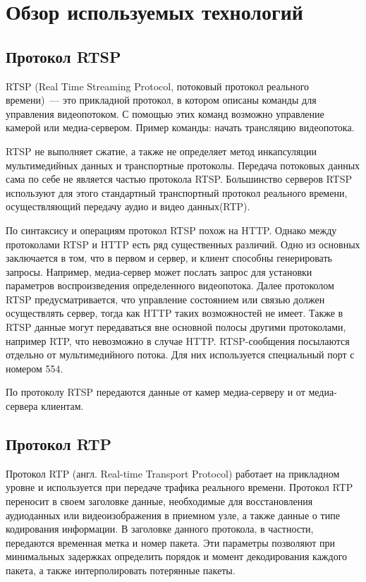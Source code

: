 \section{Обзор используемых технологий}

\subsection{Протокол RTSP}
RTSP (Real Time Streaming Protocol, потоковый протокол реального времени)~--- это прикладной протокол,
в котором описаны команды для управления видеопотоком.
С помощью этих команд возможно управление камерой или медиа-сервером.
Пример команды: начать трансляцию видеопотока.

RTSP не выполняет сжатие, а также не определяет метод инкапсуляции мультимедийных данных и
транспортные протоколы. Передача потоковых данных сама по себе не является частью протокола RTSP.
Большинство серверов RTSP используют для этого стандартный транспортный протокол реального времени,
осуществляющий передачу аудио и видео данных(RTP).

По синтаксису и операциям протокол RTSP похож на HTTP. Однако между протоколами RTSP и HTTP есть ряд
существенных различий. Одно из основных заключается в том, что в первом и сервер, и клиент способны
генерировать запросы. Например, медиа-сервер может послать запрос для установки параметров
воспроизведения определенного видеопотока. Далее протоколом RTSP предусматривается, что управление
состоянием или связью должен осуществлять сервер, тогда как HTTP таких возможностей не имеет.
Также в RTSP данные могут передаваться вне основной полосы другими протоколами,
например RTP, что невозможно в случае HTTP. RTSP-сообщения посылаются отдельно от мультимедийного
потока. Для них используется специальный порт с номером 554.

По протоколу RTSP передаются данные от камер медиа-серверу и от медиа-сервера клиентам.

\subsection{Протокол RTP}
Протокол RTP (англ. Real-time Transport Protocol) работает на прикладном уровне и используется
при передаче трафика реального времени.
Протокол RTP переносит в своем заголовке данные, необходимые для восстановления аудиоданных или
видеоизображения в приемном узле, а также данные о типе кодирования информации. В заголовке данного
протокола, в частности, передаются временная метка и номер пакета. Эти параметры позволяют при
минимальных задержках определить порядок и момент декодирования каждого пакета, а также
интерполировать потерянные пакеты.

